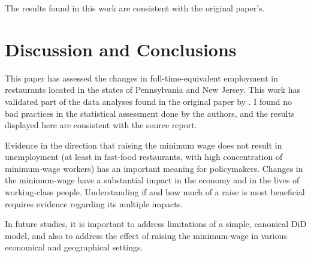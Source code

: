 \documentclass[11pt]{article}
\begin{document}
The results found in this work are consistent with the original paper's.


\section{Discussion and Conclusions}

This paper has assessed the changes in full-time-equivalent employment in restaurants located in the states of Pennsylvania and New Jersey. This work has validated part of the data analyses found in the original paper by \citet{RePEc:aea:aecrev:v:84:y:1994:i:4:p:772-93}. I found no bad practices in the statistical assessment done by the authors, and the results displayed here are consistent with the source report.

Evidence in the direction that raising the minimum wage does not result in unemployment (at least in fast-food restaurants, with high concentration of minimum-wage workers) has an important meaning for policymakers. Changes in the minimum-wage have a substantial impact in the economy and in the lives of working-class people. Understanding if and how much of a raise is most beneficial requires evidence regarding its multiple impacts.

In future studies, it is important to address limitations of a simple, canonical DiD model, and also to address the effect of raising the minimum-wage in various economical and geographical settings.



\medskip

 

\newpage







\end{document}
